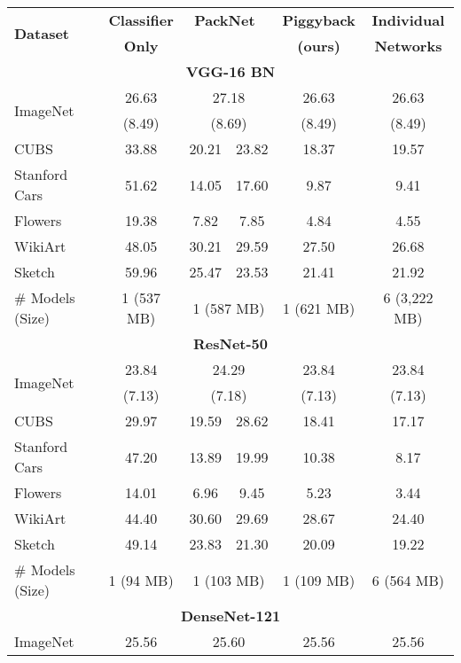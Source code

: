 \documentclass{llncs}
\begin{document}
\begin{table*}[th!]
  \centering
  \begin{tabular}{l||c|c|c|c|c}
    \hline
    \multirow{2}{*}{\bf Dataset} & {\bf Classifier} & \multicolumn{2}{c|}{\bf PackNet~\cite{mallya2017packnet}} & {\bf Piggyback} & {\bf Individual} \\
    & {\bf Only} &  &  & {\bf (ours)}& {\bf Networks} \\\hline\hline
    \multicolumn{6}{c}{\bf VGG-16 BN} \\\hline
    \multirow{2}{*}{ImageNet} & 26.63 & \multicolumn{2}{c|}{27.18} & 26.63& 26.63\\
    & (8.49) & \multicolumn{2}{c|}{(8.69)} & (8.49) & (8.49)\\\hline
    CUBS & 33.88 & 20.21 & 23.82 & 18.37 & 19.57 \\\hline
    Stanford Cars & 51.62 & 14.05 & 17.60 & 9.87 & 9.41 \\\hline
    Flowers & 19.38 & 7.82 & 7.85 & 4.84 & 4.55 \\\hline
    WikiArt & 48.05 & 30.21 & 29.59 & 27.50 & 26.68 \\\hline
    Sketch & 59.96 & 25.47 & 23.53 & 21.41 & 21.92 \\\hline\hline
    \# Models (Size) & 1 (537 MB) & \multicolumn{2}{c|}{1 (587 MB)} & 1 (621 MB) & 6 (3,222 MB)\\\hline
    \multicolumn{6}{c}{\bf ResNet-50} \\\hline
    \multirow{2}{*}{ImageNet} & 23.84 & \multicolumn{2}{c|}{24.29} & 23.84 & 23.84\\
    & (7.13) & \multicolumn{2}{c|}{(7.18)} & (7.13) & (7.13)\\\hline
    CUBS & 29.97 & 19.59 & 28.62 & 18.41 & 17.17 \\\hline
    Stanford Cars & 47.20 & 13.89 & 19.99 & 10.38 & 8.17 \\\hline
    Flowers & 14.01 & 6.96 & 9.45 & 5.23 & 3.44 \\\hline
    WikiArt & 44.40 & 30.60 & 29.69 & 28.67 & 24.40 \\\hline
    Sketch & 49.14 & 23.83 & 21.30 & 20.09 & 19.22 \\\hline\hline
    \# Models (Size) & 1 (94 MB) & \multicolumn{2}{c|}{1 (103 MB)} & 1 (109 MB) & 6 (564 MB)\\\hline
    \multicolumn{6}{c}{\bf DenseNet-121} \\\hline
    \multirow{2}{*}{ImageNet} & 25.56 & \multicolumn{2}{c|}{25.60} & 25.56 & 25.56\\

\end{tabular}
\end{table*}
\end{document}
